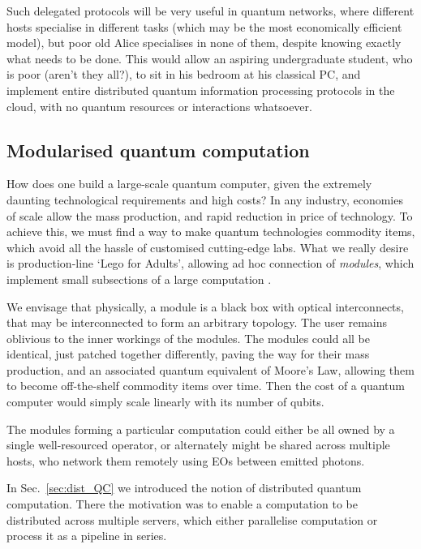 \documentclass[aps, rmp, twocolumn, amsmath, amssymb, nofootinbib, superscriptaddress, longbibliography, floatfix, table-of-contents, eqsecnum]{revtex4-1}
\begin{document}
Such delegated protocols will be very useful in quantum networks, where different hosts specialise in different tasks (which may be the most economically efficient model), but poor old Alice specialises in none of them, despite knowing exactly what needs to be done. This would allow an aspiring undergraduate student, who is poor (aren't they all?), to sit in his bedroom at his classical PC, and implement entire distributed quantum information processing protocols in the cloud, with no quantum resources or interactions whatsoever.

%
%

\subsection{Modularised quantum computation} \label{sec:module} 

How does one build a large-scale quantum computer, given the extremely daunting technological requirements and high costs? In any industry, economies of scale allow the mass production, and rapid reduction in price of technology. To achieve this, we must find a way to make quantum technologies commodity items, which avoid all the hassle of customised cutting-edge labs. What we really desire is production-line `Lego for Adults{\texttrademark}', allowing ad hoc connection of \textit{modules}, which implement small subsections of a large computation \cite{bib:FowlerPrivate}.

We envisage that physically, a module is a black box with optical interconnects, that may be interconnected to form an arbitrary topology. The user remains oblivious to the inner workings of the modules. The modules could all be identical, just patched together differently, paving the way for their mass production, and an associated quantum equivalent of Moore's Law, allowing them to become off-the-shelf commodity items over time. Then the cost of a quantum computer would simply scale linearly with its number of qubits.

The modules forming a particular computation could either be all owned by a single well-resourced operator, or alternately might be shared across multiple hosts, who network them remotely using EOs between emitted photons.

In Sec.~\ref{sec:dist_QC} we introduced the notion of distributed quantum computation. There the motivation was to enable a computation to be distributed across multiple servers, which either parallelise computation or process it as a pipeline in series.
\end{document}
